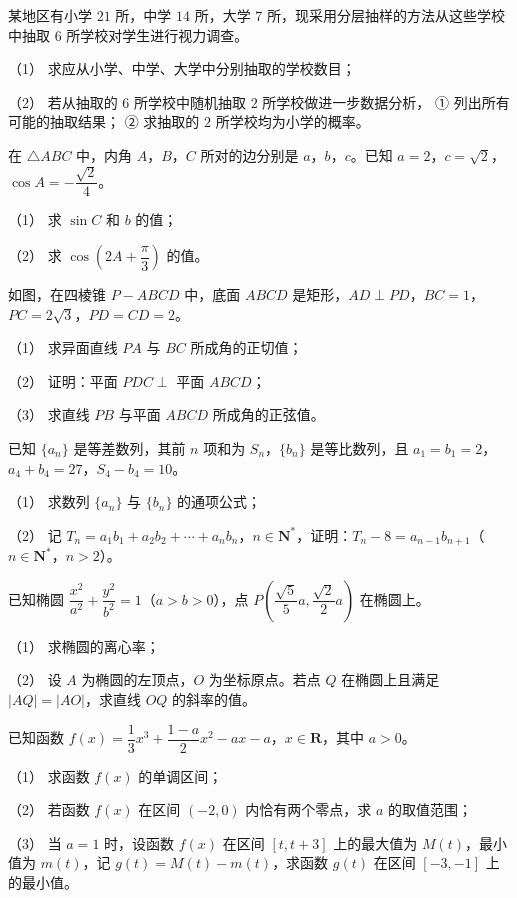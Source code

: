 \begin{question}
某地区有小学 $21$ 所，中学 $14$ 所，大学 $7$ 所，现采用分层抽样的方法从这些学校中抽取 $6$ 所学校对学生进行视力调查。

（1） 求应从小学、中学、大学中分别抽取的学校数目；

（2） 若从抽取的 $6$ 所学校中随机抽取 $2$ 所学校做进一步数据分析，
① 列出所有可能的抽取结果；
② 求抽取的 $2$ 所学校均为小学的概率。

\end{question}
\begin{question}
在 $\triangle ABC$ 中，内角 $A$，$B$，$C$ 所对的边分别是 $a$，$b$，$c$。已知 $a=2$，$c=\sqrt2$，$\cos A=-\dfrac{\sqrt2}4$。

（1） 求 $\sin C$ 和 $b$ 的值；

（2） 求 $\cos\left(2A+\dfrac\pi3\right)$ 的值。

\Needspace{0.4\textheight}
\end{question}
\begin{question}
如图，在四棱锥 $P-ABCD$ 中，底面 $ABCD$ 是矩形，$AD\perp PD$，$BC=1$，$PC=2\sqrt3$，$PD=CD=2$。

（1） 求异面直线 $PA$ 与 $BC$ 所成角的正切值；

（2） 证明：平面 $PDC\perp$ 平面 $ABCD$；

（3） 求直线 $PB$ 与平面 $ABCD$ 所成角的正弦值。
\nopagebreak[4]
\begin{center}\end{center}
\nopagebreak[4]
\end{question}
\begin{question}
已知 $\{a_n\}$ 是等差数列，其前 $n$ 项和为 $S_n$，$\{b_n\}$ 是等比数列，且 $a_1=b_1=2$，$a_4+b_4=27$，$S_4-b_4=10$。

（1） 求数列 $\{a_n\}$ 与 $\{b_n\}$ 的通项公式；

（2） 记 $T_n=a_1b_1+a_2b_2+\cdots+a_nb_n$，$n\in\mathbf N^*$，证明：$T_n-8=a_{n-1}b_{n+1}$（$n\in\mathbf N^*$，$n>2$）。

\end{question}
\begin{question}
已知椭圆 $\dfrac{x^2}{a^2}+\dfrac{y^2}{b^2}=1$（$a>b>0$），点 $P\left(\dfrac{\sqrt5}5a,\dfrac{\sqrt2}2a\right)$ 在椭圆上。

（1） 求椭圆的离心率；

（2） 设 $A$ 为椭圆的左顶点，$O$ 为坐标原点。若点 $Q$ 在椭圆上且满足 $|AQ|=|AO|$，求直线 $OQ$ 的斜率的值。

\end{question}
\begin{question}
已知函数 $f(x)=\dfrac13x^3+\dfrac{1-a}2x^2-ax-a$，$x\in\mathbf R$，其中 $a>0$。

（1） 求函数 $f(x)$ 的单调区间；

（2） 若函数 $f(x)$ 在区间 $(-2,0)$ 内恰有两个零点，求 $a$ 的取值范围；

（3） 当 $a=1$ 时，设函数 $f(x)$ 在区间 $[t,t+3]$ 上的最大值为 $M(t)$，最小值为 $m(t)$，记 $g(t)=M(t)-m(t)$，求函数 $g(t)$ 在区间 $[-3,-1]$ 上的最小值。

\clearpage

\end{question}